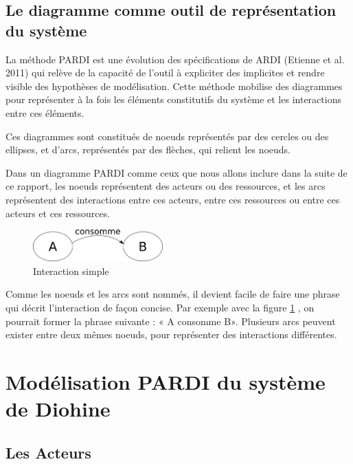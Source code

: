 \subsection{Le diagramme comme outil de représentation du système}

La méthode PARDI est une évolution des spécifications de ARDI \cite{etienne_ardi_2011}(Etienne et al. 2011) qui relève de la capacité de l'outil à expliciter des implicites et rendre visible des  hypothèses de modélisation. Cette méthode mobilise des diagrammes pour représenter à la fois les éléments constitutifs du système et les interactions entre ces éléments.

Ces diagrammes sont constitués de noeuds représentés par des cercles ou des ellipses, et d'arcs, représentés par des flèches, qui relient les noeuds.

Dans un diagramme PARDI comme ceux que nous allons inclure dans la suite de ce rapport, les noeuds représentent des acteurs ou des ressources, et les arcs représentent des interactions entre ces acteurs, entre ces ressources ou entre ces acteurs et ces ressources.

\begin{figure}
  \begin{center}
    \includegraphics[width=5cm]{img/diagramme_simple.png}
  \end{center}
  \caption{Interaction simple }
  \label{simple_interac}
\end{figure}



Comme les noeuds et les arcs sont nommés, il devient facile de faire une phrase qui décrit l'interaction de façon concise. Par exemple avec la figure \ref{simple_interac} , on pourrait former la phrase suivante : « A consomme B». Plusieurs arcs peuvent exister entre deux mêmes noeuds, pour représenter des interactions différentes.


\section{Modélisation PARDI du système de Diohine}

\subsection{Les Acteurs}

